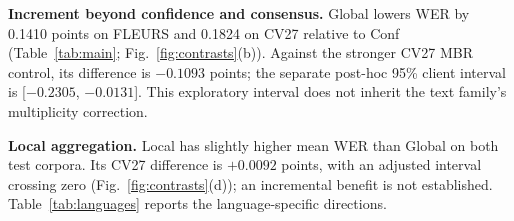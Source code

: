 

\noindent\textbf{Increment beyond confidence and consensus.} Global lowers WER by 0.1410 points on FLEURS and 0.1824 on CV27 relative to Conf (Table~\ref{tab:main}; Fig.~\ref{fig:contrasts}(b)). Against the stronger CV27 MBR control, its difference is $-0.1093$ points; the separate post-hoc 95\% client interval is [$-0.2305$, $-0.0131$]. This exploratory interval does not inherit the text family's multiplicity correction.

\noindent\textbf{Local aggregation.} Local has slightly higher mean WER than Global on both test corpora. Its CV27 difference is $+0.0092$ points, with an adjusted interval crossing zero (Fig.~\ref{fig:contrasts}(d)); an incremental benefit is not established. Table~\ref{tab:languages} reports the language-specific directions.
